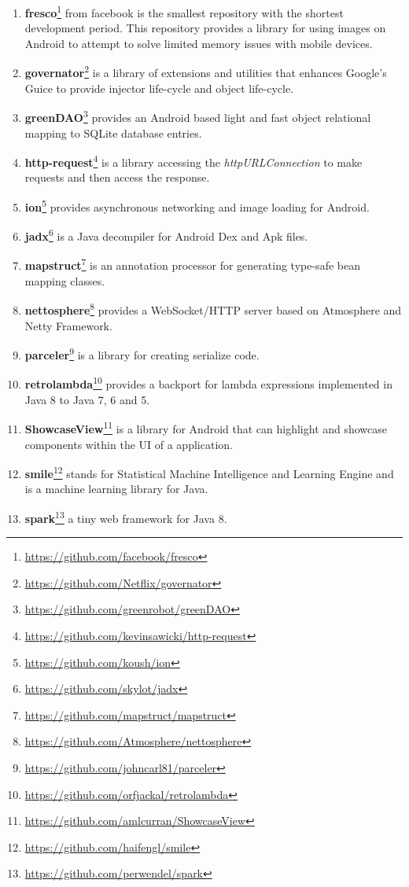 \begin{enumerate}
\item \textbf{fresco}\footnote{\url{https://github.com/facebook/fresco}} from facebook is the smallest repository with the shortest development period. This repository provides a library for using images on Android to attempt to solve limited memory issues with mobile devices.
\item \textbf{governator}\footnote{\url{https://github.com/Netflix/governator}} is a library of extensions and utilities that enhances Google's Guice to provide injector life-cycle and object life-cycle.
\item \textbf{greenDAO}\footnote{\url{https://github.com/greenrobot/greenDAO}} provides an Android based light and fast object relational mapping to SQLite database entries.
\item \textbf{http-request}\footnote{\url{https://github.com/kevinsawicki/http-request}} is a library accessing the \textit{httpURLConnection} to make requests and then access the response.
\item \textbf{ion}\footnote{\url{https://github.com/koush/ion}} provides asynchronous networking and image loading for Android.
\item \textbf{jadx}\footnote{\url{https://github.com/skylot/jadx}} is a Java decompiler for Android Dex and Apk files.
\item \textbf{mapstruct}\footnote{\url{https://github.com/mapstruct/mapstruct}} is an annotation processor for generating type-safe bean mapping classes.
\item \textbf{nettosphere}\footnote{\url{https://github.com/Atmosphere/nettosphere}} provides a WebSocket/HTTP server based on Atmosphere and Netty Framework.
\item \textbf{parceler}\footnote{\url{https://github.com/johncarl81/parceler}} is a library for creating serialize code.
\item \textbf{retrolambda}\footnote{\url{https://github.com/orfjackal/retrolambda}} provides a backport for lambda expressions implemented in Java 8 to Java 7, 6 and 5. 
\item \textbf{ShowcaseView}\footnote{\url{https://github.com/amlcurran/ShowcaseView}} is a library for Android that can highlight and showcase components within the UI of a application.
\item \textbf{smile}\footnote{\url{https://github.com/haifengl/smile}} stands for Statistical Machine Intelligence and Learning Engine and is a machine learning library for Java.
\item \textbf{spark}\footnote{\url{https://github.com/perwendel/spark}} a tiny web framework for Java 8.

\end{enumerate}
